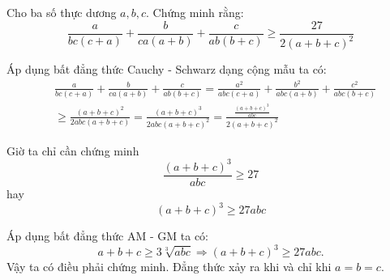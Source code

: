 \begin{problem}		
	Cho ba số thực dương $a, b, c$. Chứng minh rằng:
	$$
		\frac{a}{bc(c + a)} + \frac{b}{ca(a + b)} + \frac{c}{ab(b + c)}
		\ge \frac{27}{2(a + b + c)^2}
	$$
	\solution
	
	Áp dụng bất đẳng thức Cauchy - Schwarz dạng cộng mẫu ta có:
	\begin{align*}
		&\frac{a}{bc(c + a)} + \frac{b}{ca(a + b)} + \frac{c}{ab(b + c)} 
		= \frac{a^2}{abc(c + a)} + \frac{b^2}{abc(a + b)} + \frac{c^2}{abc(b + c)} \\
		&\ge \frac{(a + b + c)^2}{2abc(a + b + c)} 
		= \frac{(a + b + c)^3}{2abc(a + b + c)^2}
		= \frac{\frac{(a + b + c)^3}{abc}}{2(a + b + c)^2}
	\end{align*}

	Giờ ta chỉ cần chứng minh 
	$$
		\frac{(a + b + c)^3}{abc} \ge 27
	$$
	hay 
	$$
		(a + b + c)^3 \ge 27abc
	$$

	Áp dụng bất đẳng thức AM - GM ta có:
	$$
		a + b + c \ge 3\sqrt[3]{abc}
		\Rightarrow (a + b + c)^3 \ge 27abc.
	$$
	Vậy ta có điều phải chứng minh. Đẳng thức xảy ra khi và chỉ khi $a = b = c$.
	
\end{problem}		